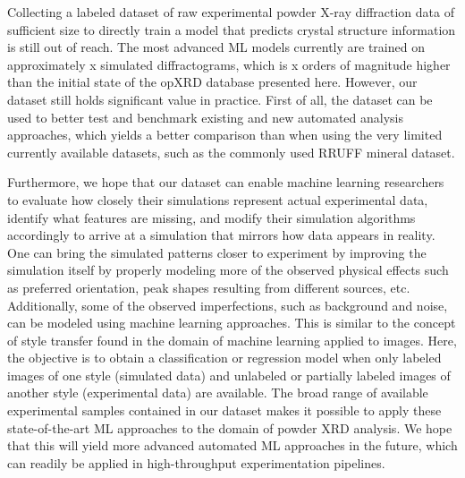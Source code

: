 Collecting a labeled dataset of raw experimental powder X-ray diffraction data of sufficient size to directly train a model that predicts crystal structure information is still out of reach.
The most advanced ML models currently are trained on approximately x simulated diffractograms, which is x orders of magnitude higher than the initial state of the opXRD database presented here.
However, our dataset still holds significant value in practice. First of all, the dataset can be used to better test and benchmark existing and new automated analysis approaches, which yields a better comparison than when using the very limited currently available datasets, such as the commonly used RRUFF mineral dataset.

Furthermore, we hope that our dataset can enable machine learning researchers to evaluate how closely their simulations
represent actual experimental data, identify what features are missing, and modify their simulation algorithms accordingly to arrive at a simulation that mirrors how data appears in reality.
One can bring the simulated patterns closer to experiment by improving the simulation itself by properly modeling more of the observed physical effects such as preferred orientation, peak shapes resulting from different sources, etc.
Additionally, some of the observed imperfections, such as background and noise, can be modeled using machine learning approaches.
This is similar to the concept of style transfer\cite{Gatys2016,Ganin2015} found in the domain of machine learning applied to images.
Here, the objective is to obtain a classification or regression model when only labeled images of one style (simulated data) and unlabeled or partially labeled images of another style (experimental data) are available.
The broad range of available experimental samples contained in our dataset makes it possible to apply these state-of-the-art ML approaches to the domain of powder XRD analysis.
We hope that this will yield more advanced automated ML approaches in the future, which can readily be applied in high-throughput experimentation pipelines.















